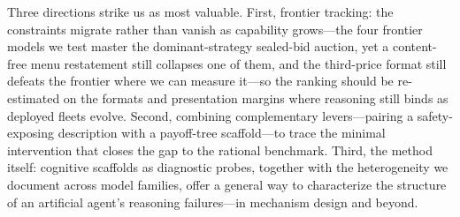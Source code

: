 Three directions strike us as most valuable. First, frontier tracking: the constraints migrate rather than vanish as capability grows---the four frontier models we test master the dominant-strategy sealed-bid auction, yet a content-free menu restatement still collapses one of them, and the third-price format still defeats the frontier where we can measure it---so the ranking should be re-estimated on the formats and presentation margins where reasoning still binds as deployed fleets evolve. Second, combining complementary levers---pairing a safety-exposing description with a payoff-tree scaffold---to trace the minimal intervention that closes the gap to the rational benchmark. Third, the method itself: cognitive scaffolds as diagnostic probes, together with the heterogeneity we document across model families, offer a general way to characterize the structure of an artificial agent's reasoning failures---in mechanism design and beyond.
